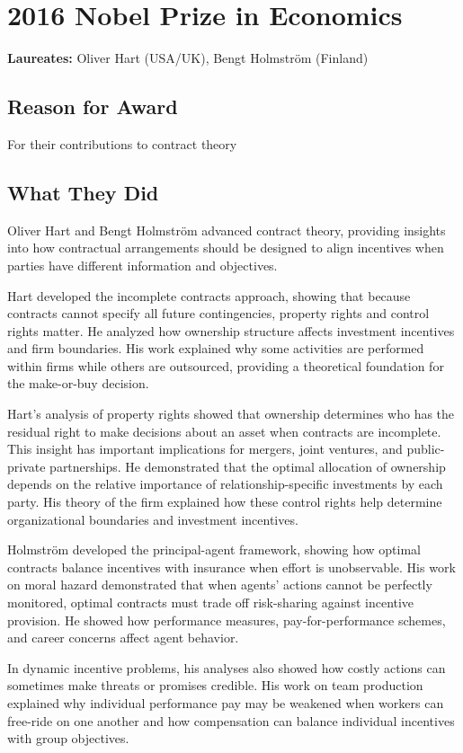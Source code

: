 \chapter{2016 Nobel Prize in Economics}
\textbf{Laureates: }Oliver Hart (USA/UK), Bengt Holmström (Finland)

\section*{Reason for Award}
For their contributions to contract theory

\section{What They Did}
Oliver Hart and Bengt Holmström advanced contract theory, providing insights
into how contractual arrangements should be designed to align incentives when
parties have different information and objectives.

Hart developed the incomplete contracts approach, showing that because contracts
cannot specify all future contingencies, property rights and control rights
matter. He analyzed how ownership structure affects investment incentives and
firm boundaries. His work explained why some activities are performed within
firms while others are outsourced, providing a theoretical foundation for the
make-or-buy decision.

Hart's analysis of property rights showed that ownership determines who has the
residual right to make decisions about an asset when contracts are incomplete.
This insight has important implications for mergers, joint ventures, and
public-private partnerships. He demonstrated that the optimal allocation of
ownership depends on the relative importance of relationship-specific investments
by each party. His theory of the firm explained how these control rights help
determine organizational boundaries and investment incentives.

Holmström developed the principal-agent framework, showing how optimal contracts
balance incentives with insurance when effort is unobservable. His work on
moral hazard demonstrated that when agents' actions cannot be perfectly monitored,
optimal contracts must trade off risk-sharing against incentive provision.
He showed how performance measures, pay-for-performance schemes, and career
concerns affect agent behavior.

In dynamic incentive problems, his analyses also showed how costly actions can
sometimes make threats or promises credible. His
work on team production explained why individual performance pay may be weakened
when workers can free-ride on one another and how compensation can balance
individual incentives with group objectives.

